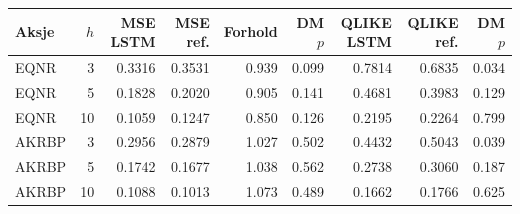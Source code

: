 \begin{tabular}{lrrrrrrrr}
\toprule
Aksje & $h$ & MSE LSTM & MSE ref. & Forhold & DM $p$ & QLIKE LSTM & QLIKE ref. & DM $p$ \\
\midrule
EQNR & 3 & 0.3316 & 0.3531 & 0.939 & 0.099 & 0.7814 & 0.6835 & 0.034 \\
EQNR & 5 & 0.1828 & 0.2020 & 0.905 & 0.141 & 0.4681 & 0.3983 & 0.129 \\
EQNR & 10 & 0.1059 & 0.1247 & 0.850 & 0.126 & 0.2195 & 0.2264 & 0.799 \\
AKRBP & 3 & 0.2956 & 0.2879 & 1.027 & 0.502 & 0.4432 & 0.5043 & 0.039 \\
AKRBP & 5 & 0.1742 & 0.1677 & 1.038 & 0.562 & 0.2738 & 0.3060 & 0.187 \\
AKRBP & 10 & 0.1088 & 0.1013 & 1.073 & 0.489 & 0.1662 & 0.1766 & 0.625 \\
\bottomrule
\end{tabular}
